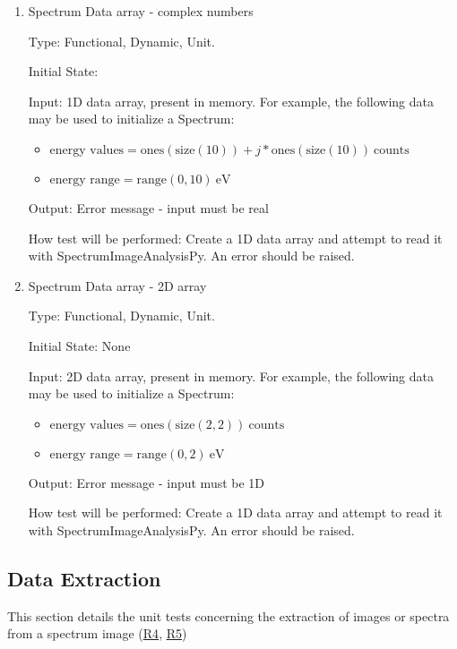 \documentclass[12pt, titlepage]{article}
\newcommand{\progname}{SpectrumImageAnalysisPy}
\begin{document}
\begin{enumerate}
Output: Spectrum stored within \progname{}, with data assigned to appropriate
values

How test will be performed: A csv file containing 1D spectrum data will be
imported. No errors should be raised. The unit test will check that the
intensity and energy range are assigned to the appropriate variables, as well as
the spectral calibration.


\item{Spectrum Data array - complex numbers}

Type: Functional, Dynamic, Unit.

Initial State: 

Input: 1D data array, present in memory. For example, the following data may be
used to initialize a Spectrum:
\begin{itemize}
	\item $\text{energy values} = \text{ones}(\text{size}(10)) +
j*\text{ones}(\text{size}(10))\ \text{counts}$
	\item $\text{energy range} = \text{range}(0, 10)\ \si{\electronvolt}$
\end{itemize}

Output: Error message - input must be real

How test will be performed: Create a 1D data array and attempt to read it with
\progname{}. An error should be raised.


\item{Spectrum Data array - 2D array}

Type: Functional, Dynamic, Unit.

Initial State: None

Input: 2D data array, present in memory. For example, the following data may be
used to initialize a Spectrum:
\begin{itemize}
	\item $\text{energy values} = \text{ones}(\text{size}(2, 2))\ \text{counts}$
	\item $\text{energy range} = \text{range}(0, 2)\ \si{\electronvolt}$
\end{itemize}

Output: Error message - input must be 1D

How test will be performed: Create a 1D data array and attempt to read it with
\progname{}. An error should be raised.

\end{enumerate}

\subsection{Data Extraction}
This section details the unit tests concerning the extraction of images or
spectra from a spectrum image (\hyperref[R_SI_slicing]{R4},
\hyperref[R_SI_area]{R5})
\end{document}

